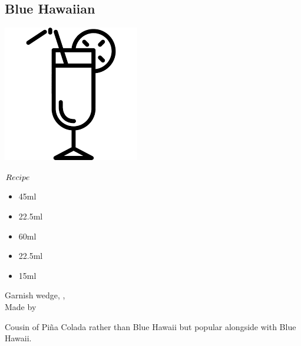 \subsection{Blue Hawaiian}
\vspace{-7.4mm}
\hspace{42mm}
\includegraphics[scale=.07]{cocktail_glass_tall.png}
\vspace{2.5mm}
\begin{itembox}[l]{\boldmath $Recipe$}
\begin{itemize}
\setlength{\parskip}{0cm}
\setlength{\itemsep}{0cm}
\item \lrum 45ml
\item \bc 22.5ml
\item \pj 60ml
\item \cococ 22.5ml
\item \lj 15ml
\end{itemize}
\vspace{-4mm}
Garnish \pineapple wedge, \cherry, \umbrella\\
Made by \shake
\end{itembox}
Cousin of Pi\~{n}a Colada rather than Blue Hawaii but popular alongside with Blue Hawaii.
